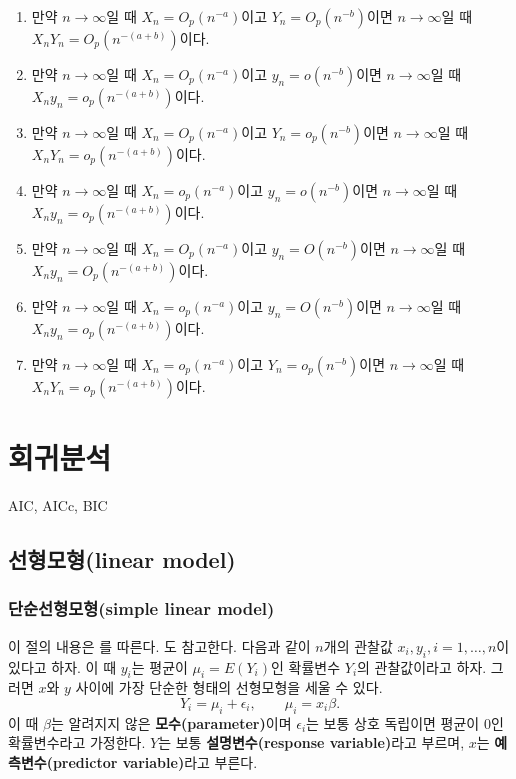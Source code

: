 \documentclass[b5paper,]{scrbook}
\theoremstyle{plain}
\theoremstyle{definition}
\numberwithin{equation}{section}
\begin{document}
\begin{enumerate}
\def\labelenumi{\arabic{enumi}.}
\item
  만약 \(n\rightarrow \infty\)일 때 \(X_{n}=O_{p}(n^{-a})\)이고 \(Y_{n}=O_{p}(n^{-b})\)이면 \(n\rightarrow \infty\)일 때 \(X_{n}Y_{n}=O_{p}(n^{-(a+b)})\)이다.
\item
  만약 \(n\rightarrow \infty\)일 때 \(X_{n}=O_{p}(n^{-a})\)이고 \(y_{n}=o(n^{-b})\)이면 \(n\rightarrow \infty\)일 때 \(X_{n}y_{n}=o_{p}(n^{-(a+b)})\)이다.
\item
  만약 \(n\rightarrow \infty\)일 때 \(X_{n}=O_{p}(n^{-a})\)이고 \(Y_{n}=o_{p}(n^{-b})\)이면 \(n\rightarrow \infty\)일 때 \(X_{n}Y_{n}=o_{p}(n^{-(a+b)})\)이다.
\item
  만약 \(n\rightarrow \infty\)일 때 \(X_{n}=o_{p}(n^{-a})\)이고 \(y_{n}=o(n^{-b})\)이면 \(n\rightarrow \infty\)일 때 \(X_{n}y_{n}=o_{p}(n^{-(a+b)})\)이다.
\item
  만약 \(n\rightarrow \infty\)일 때 \(X_{n}=O_{p}(n^{-a})\)이고 \(y_{n}=O(n^{-b})\)이면 \(n\rightarrow \infty\)일 때 \(X_{n}y_{n}=O_{p}(n^{-(a+b)})\)이다.
\item
  만약 \(n\rightarrow \infty\)일 때 \(X_{n}=o_{p}(n^{-a})\)이고 \(y_{n}=O(n^{-b})\)이면 \(n\rightarrow \infty\)일 때 \(X_{n}y_{n}=o_{p}(n^{-(a+b)})\)이다.
\item
  만약 \(n\rightarrow \infty\)일 때 \(X_{n}=o_{p}(n^{-a})\)이고 \(Y_{n}=o_{p}(n^{-b})\)이면 \(n\rightarrow \infty\)일 때 \(X_{n}Y_{n}=o_{p}(n^{-(a+b)})\)이다.
\end{enumerate}

\hypertarget{reg}{%
\chapter{회귀분석}\label{reg}}

AIC, AICc, BIC

\hypertarget{linear-model}{%
\section{선형모형(linear model)}\label{linear-model}}

\hypertarget{simple-linear-model}{%
\subsection{단순선형모형(simple linear model)}\label{simple-linear-model}}

이 절의 내용은 \citep{Yee2015}를 따른다. \citep{Wood2006}도 참고한다. 다음과 같이 \(n\)개의 관찰값 \(x_{i},y_{i}, i=1,\ldots,n\)이 있다고 하자. 이 때 \(y_{i}\)는 평균이 \(\mu_{i}=E(Y_{i})\)인 확률변수 \(Y_{i}\)의 관찰값이라고 하자. 그러면 \(x\)와 \(y\) 사이에 가장 단순한 형태의 선형모형을 세울 수 있다.
\[Y_{i}=\mu_{i}+\epsilon_{i}, \qquad{\mu_{i}=x_{i}\beta}.\]
이 때 \(\beta\)는 알려지지 않은 \textbf{모수(parameter)}이며 \(\epsilon_{i}\)는 보통 상호 독립이면 평균이 0인 확률변수라고 가정한다. \(Y\)는 보통 \textbf{설명변수(response variable)}라고 부르며, \(x\)는 \textbf{예측변수(predictor variable)}라고 부른다.
\end{document}
